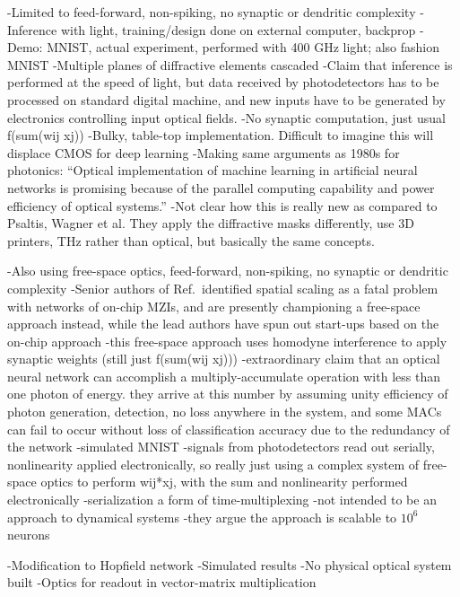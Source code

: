 \vspace{3em}
\cite{liri2018}
-Limited to feed-forward, non-spiking, no synaptic or dendritic complexity
-Inference with light, training/design done on external computer, backprop
-Demo: MNIST, actual experiment, performed with 400 GHz light; also fashion MNIST
-Multiple planes of diffractive elements cascaded
-Claim that inference is performed at the speed of light, but data received by photodetectors has to be processed on standard digital machine, and new inputs have to be generated by electronics controlling input optical fields.
-No synaptic computation, just usual f(sum(wij xj))
-Bulky, table-top implementation. Difficult to imagine this will displace CMOS for deep learning
-Making same arguments as 1980s for photonics: ``Optical implementation of machine learning in artificial neural networks is promising because of the parallel computing capability and power efficiency of optical systems.''
-Not clear how this is really new as compared to Psaltis, Wagner et al. They apply the diffractive masks differently, use 3D printers, THz rather than optical, but basically the same concepts.

\cite{hasl2018}
-Also using free-space optics, feed-forward, non-spiking, no synaptic or dendritic complexity
-Senior authors of Ref.\,\cite{shha2016} identified spatial scaling as a fatal problem with networks of on-chip MZIs, and are presently championing a free-space approach instead, while the lead authors have spun out start-ups based on the on-chip approach
-this free-space approach uses homodyne interference to apply synaptic weights (still just f(sum(wij xj)))
-extraordinary claim that an optical neural network can accomplish a multiply-accumulate operation with less than one photon of energy. they arrive at this number by assuming unity efficiency of photon generation, detection, no loss anywhere in the system, and some MACs can fail to occur without loss of classification accuracy due to the redundancy of the network
-simulated MNIST
-signals from photodetectors read out serially, nonlinearity applied electronically, so really just using a complex system of free-space optics to perform wij*xj, with the sum and nonlinearity performed electronically
-serialization a form of time-multiplexing
-not intended to be an approach to dynamical systems
-they argue the approach is scalable to $10^6$ neurons

\vspace{3em}
\cite{maar1987}
-Modification to Hopfield network
-Simulated results
-No physical optical system built
-Optics for readout in vector-matrix multiplication


